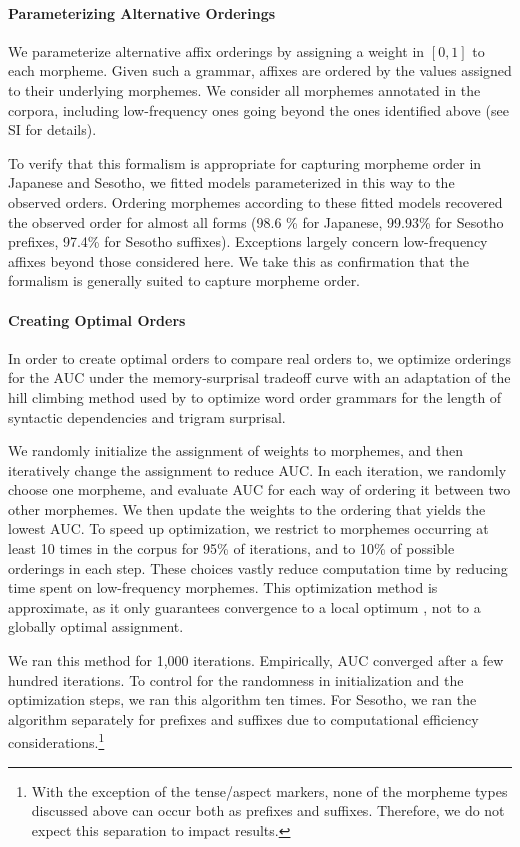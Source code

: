 \paragraph{Parameterizing Alternative Orderings}

We parameterize alternative affix orderings by assigning a weight in $[0,1]$ to each morpheme.
Given such a grammar, affixes are ordered by the values assigned to their underlying morphemes.
We consider all morphemes annotated in the corpora, including low-frequency ones going beyond the ones identified above (see SI for details).


To verify that this formalism is appropriate for capturing morpheme order in Japanese and Sesotho, we fitted models parameterized in this way to the observed orders.
Ordering morphemes according to these fitted models recovered the observed order for almost all forms (98.6 \% for Japanese, 99.93\% for Sesotho prefixes, 97.4\% for Sesotho suffixes). Exceptions largely concern low-frequency affixes beyond those considered here. We take this as confirmation that the formalism is generally suited to capture morpheme order.


\paragraph{Creating Optimal Orders}

In order to create optimal orders to compare real orders to, we optimize orderings for the AUC under the memory-surprisal tradeoff curve with an adaptation of the hill climbing method used by \citet{gildea-human-2015} to optimize word order grammars for the length of syntactic dependencies and trigram surprisal.

We randomly initialize the assignment of weights to morphemes, and then iteratively change the assignment to reduce AUC.
In each iteration, we randomly choose one morpheme, and evaluate AUC for each way of ordering it between two other morphemes.
We then update the weights to the ordering that yields the lowest AUC.
To speed up optimization, we restrict to morphemes occurring at least 10 times in the corpus for 95\% of iterations, and to 10\% of possible orderings in each step.
These choices vastly reduce computation time by reducing time spent on low-frequency morphemes.
This optimization method is approximate, as it only guarantees convergence to a local optimum \citep{gildea-human-2015}, not to a globally optimal assignment.

We ran this method for 1,000 iterations. Empirically, AUC converged after a few hundred iterations.
To control for the randomness in initialization and the optimization steps, we ran this algorithm ten times.
For Sesotho, we ran the algorithm separately for prefixes and suffixes due to computational efficiency considerations.\footnote{With the exception of the tense/aspect markers, none of the morpheme types discussed above can occur both as prefixes and suffixes. Therefore, we do not expect this separation to impact results.}

